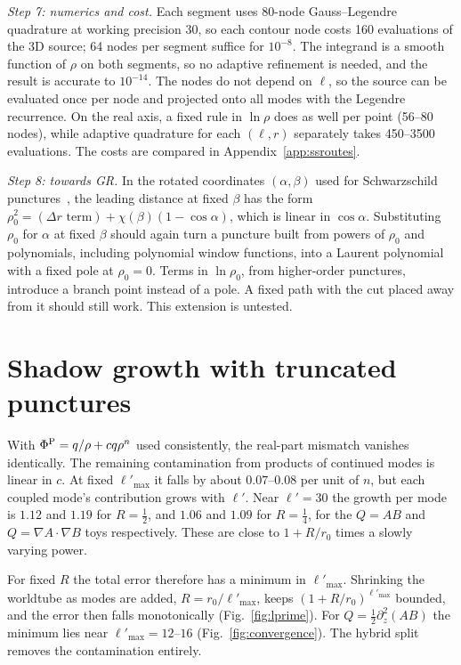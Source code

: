 \documentclass[aps,prd,twocolumn,superscriptaddress,nofootinbib,floatfix]{revtex4-2}
\newcommand{\PhiP}{\Phi^{\rm P}}
\begin{document}
\emph{Step 7: numerics and cost.}
Each segment uses 80-node Gauss--Legendre quadrature at working precision 30, so each contour node costs 160 evaluations of the 3D source; 64 nodes per segment suffice for $10^{-8}$.
The integrand is a smooth function of $\rho$ on both segments, so no adaptive refinement is needed, and the result is accurate to $10^{-14}$.
The nodes do not depend on $\ell$, so the source can be evaluated once per node and projected onto all modes with the Legendre recurrence.
On the real axis, a fixed rule in $\ln\rho$ does as well per point (56--80 nodes), while adaptive quadrature for each $(\ell,r)$ separately takes 450--3500 evaluations.
The costs are compared in Appendix~\ref{app:ssroutes}.

\emph{Step 8: towards GR.}
In the rotated coordinates $(\alpha,\beta)$ used for Schwarzschild punctures~\cite{Upton2026}, the leading distance at fixed $\beta$ has the form $\rho_0^2=(\Delta r\text{ term})+\chi(\beta)(1-\cos\alpha)$, which is linear in $\cos\alpha$.
Substituting $\rho_0$ for $\alpha$ at fixed $\beta$ should again turn a puncture built from powers of $\rho_0$ and polynomials, including polynomial window functions, into a Laurent polynomial with a fixed pole at $\rho_0=0$.
Terms in $\ln\rho_0$, from higher-order punctures, introduce a branch point instead of a pole. A fixed path with the cut placed away from it should still work.
This extension is untested.

\section{Shadow growth with truncated punctures}\label{app:shadow}
With $\PhiP=q/\rho+cq\rho^n$ used consistently, the real-part mismatch vanishes identically.
The remaining contamination from products of continued modes is linear in $c$.
At fixed $\ell'_{\max}$ it falls by about $0.07$--$0.08$ per unit of $n$, but each coupled mode's contribution grows with $\ell'$.
Near $\ell'=30$ the growth per mode is $1.12$ and $1.19$ for $R=\tfrac12$, and $1.06$ and $1.09$ for $R=\tfrac14$, for the $Q=AB$ and $Q=\nabla A\cdot\nabla B$ toys respectively.
These are close to $1+R/r_0$ times a slowly varying power.

For fixed $R$ the total error therefore has a minimum in $\ell'_{\max}$.
Shrinking the worldtube as modes are added, $R=r_0/\ell'_{\max}$, keeps $(1+R/r_0)^{\ell'_{\max}}$ bounded, and the error then falls monotonically (Fig.~\ref{fig:lprime}).
For $Q=\tfrac12\partial_z^2(AB)$ the minimum lies near $\ell'_{\max}=12$--$16$ (Fig.~\ref{fig:convergence}).
The hybrid split removes the contamination entirely.
\end{document}
